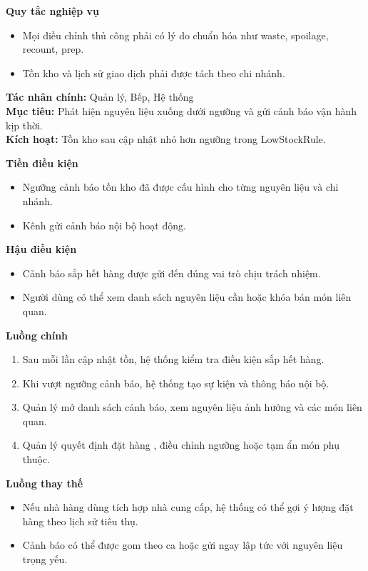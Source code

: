 \documentclass[11pt,a4paper]{article}
\begin{document}
\begin{usecasebox}[title={UC-INV-01 --- Cập nhật tiêu hao tồn kho sau phục vụ}]
    \textbf{Quy tắc nghiệp vụ}
    \begin{itemize}[leftmargin=1.8em]
  \item Mọi điều chỉnh thủ công phải có lý do chuẩn hóa như waste, spoilage, recount, prep.
  \item Tồn kho và lịch sử giao dịch phải được tách theo chi nhánh.
\end{itemize}
    \end{usecasebox}



    \begin{usecasebox}[title={UC-INV-02 --- Nhận cảnh báo sắp hết hàng}]
    \textbf{Tác nhân chính:} Quản lý, Bếp, Hệ thống\\
    \textbf{Mục tiêu:} Phát hiện nguyên liệu xuống dưới ngưỡng và gửi cảnh báo vận hành kịp thời.\\
    \textbf{Kích hoạt:} Tồn kho sau cập nhật nhỏ hơn ngưỡng trong \textsf{LowStockRule}.

    \medskip
    \textbf{Tiền điều kiện}
    \begin{itemize}[leftmargin=1.8em]
  \item Ngưỡng cảnh báo tồn kho đã được cấu hình cho từng nguyên liệu và chi nhánh.
  \item Kênh gửi cảnh báo nội bộ hoạt động.
\end{itemize}

    \textbf{Hậu điều kiện}
    \begin{itemize}[leftmargin=1.8em]
  \item Cảnh báo sắp hết hàng được gửi đến đúng vai trò chịu trách nhiệm.
  \item Người dùng có thể xem danh sách nguyên liệu cần  hoặc khóa bán món liên quan.
\end{itemize}

    \textbf{Luồng chính}
    \begin{enumerate}[leftmargin=1.8em]
  \item Sau mỗi lần cập nhật tồn, hệ thống kiểm tra điều kiện sắp hết hàng.
  \item Khi vượt ngưỡng cảnh báo, hệ thống tạo sự kiện và thông báo nội bộ.
  \item Quản lý mở danh sách cảnh báo, xem nguyên liệu ảnh hưởng và các món liên quan.
  \item Quản lý quyết định đặt hàng , điều chỉnh ngưỡng hoặc tạm ẩn món phụ thuộc.
\end{enumerate}

    \textbf{Luồng thay thế}
    \begin{itemize}[leftmargin=1.8em]
  \item Nếu nhà hàng dùng tích hợp nhà cung cấp, hệ thống có thể gợi ý lượng đặt hàng theo lịch sử tiêu thụ.
  \item Cảnh báo có thể được gom theo ca hoặc gửi ngay lập tức với nguyên liệu trọng yếu.
\end{itemize}


\end{usecasebox}
\end{document}
